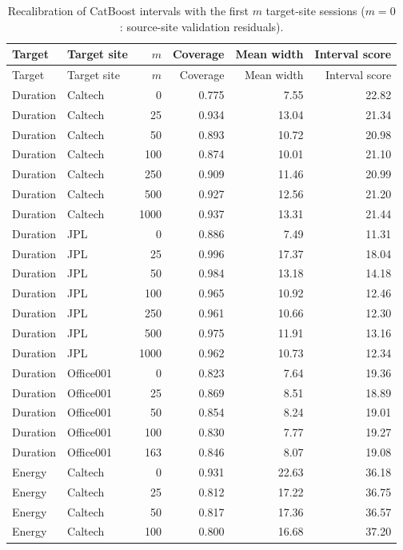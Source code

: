 {\footnotesize\begin{longtable}{llrrrr}
\caption{Recalibration of CatBoost intervals with the first $m$ target-site sessions ($m=0$: source-site validation residuals).}\label{tab:s-budget}\\
\toprule
Target & Target site & $m$ & Coverage & Mean width & Interval score \\
\midrule
\endfirsthead
\toprule
Target & Target site & $m$ & Coverage & Mean width & Interval score \\
\midrule
\endhead
\bottomrule
\endfoot
Duration & Caltech & 0 & 0.775 & 7.55 & 22.82 \\
Duration & Caltech & 25 & 0.934 & 13.04 & 21.34 \\
Duration & Caltech & 50 & 0.893 & 10.72 & 20.98 \\
Duration & Caltech & 100 & 0.874 & 10.01 & 21.10 \\
Duration & Caltech & 250 & 0.909 & 11.46 & 20.99 \\
Duration & Caltech & 500 & 0.927 & 12.56 & 21.20 \\
Duration & Caltech & 1000 & 0.937 & 13.31 & 21.44 \\
Duration & JPL & 0 & 0.886 & 7.49 & 11.31 \\
Duration & JPL & 25 & 0.996 & 17.37 & 18.04 \\
Duration & JPL & 50 & 0.984 & 13.18 & 14.18 \\
Duration & JPL & 100 & 0.965 & 10.92 & 12.46 \\
Duration & JPL & 250 & 0.961 & 10.66 & 12.30 \\
Duration & JPL & 500 & 0.975 & 11.91 & 13.16 \\
Duration & JPL & 1000 & 0.962 & 10.73 & 12.34 \\
Duration & Office001 & 0 & 0.823 & 7.64 & 19.36 \\
Duration & Office001 & 25 & 0.869 & 8.51 & 18.89 \\
Duration & Office001 & 50 & 0.854 & 8.24 & 19.01 \\
Duration & Office001 & 100 & 0.830 & 7.77 & 19.27 \\
Duration & Office001 & 163 & 0.846 & 8.07 & 19.08 \\
Energy & Caltech & 0 & 0.931 & 22.63 & 36.18 \\
Energy & Caltech & 25 & 0.812 & 17.22 & 36.75 \\
Energy & Caltech & 50 & 0.817 & 17.36 & 36.57 \\
Energy & Caltech & 100 & 0.800 & 16.68 & 37.20 \\

\end{longtable}}
